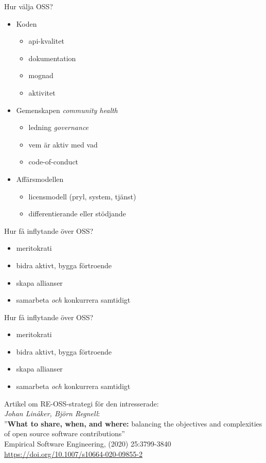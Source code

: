\documentclass{simpleslides}
\begin{document}
\begin{Slide}{Hur välja OSS?}
\begin{itemize}
\item Koden
\begin{itemize}
\item api-kvalitet 
\item dokumentation
\item mognad
\item aktivitet
\end{itemize}  
\item Gemenskapen \hfill \emph{community health}
\begin{itemize}
\item ledning \hfill \emph{governance}
\item vem är aktiv med vad
\item code-of-conduct 
\end{itemize}  
\item Affärsmodellen
\begin{itemize}
\item licensmodell (pryl, system, tjänst)
\item differentierande eller stödjande
\end{itemize}  
\end{itemize}  
\end{Slide}

\begin{Slide}{Hur få inflytande över OSS?}
\begin{itemize}
  \item meritokrati
  \item bidra aktivt, bygga förtroende
  \item skapa allianser
  \item samarbeta \emph{och} konkurrera samtidigt
\end{itemize}  
\end{Slide}


\begin{Slide}{Hur få inflytande över OSS?}
\begin{itemize}
  \item meritokrati
  \item bidra aktivt, bygga förtroende
  \item skapa allianser
  \item samarbeta \emph{och} konkurrera samtidigt
\end{itemize}  

\vspace{1em}
{
\small Artikel om RE-OSS-strategi för den intresserade: \\\emph{Johan Linåker, Björn Regnell}:\\ ''\textbf{What to share, when, and where:} balancing the objectives and complexities of open source software contributions'' \\Empirical Software Engineering, (2020) 25:3799-3840 } \\ {\tiny \url{https://doi.org/10.1007/s10664-020-09855-2}}
\end{Slide}
\end{document}
